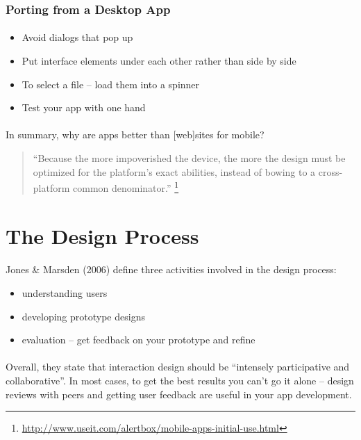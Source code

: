 \subsubsection{Porting from a Desktop App} 
\paragraph{} 

\begin{itemize}
\item Avoid dialogs that pop up
\item Put interface elements under each other rather than side by side
\item To select a file – load them into a spinner
\item Test your app with one hand
\end{itemize}


\paragraph{} In summary, why are apps better than [web]sites for mobile? 
\begin{quote}
``Because the more impoverished the device, the more the design must be optimized for the platform's exact abilities, instead of bowing to a cross-platform common denominator.'' \footnote{\url{http://www.useit.com/alertbox/mobile-apps-initial-use.html}}
\end{quote}

\section{The Design Process}
\paragraph{} Jones \& Marsden (2006) define three activities involved in the design process:

\begin{itemize}
\item understanding users
\item developing prototype designs
\item evaluation – get feedback on your prototype and refine
\end{itemize}

\paragraph{} Overall, they state that interaction design should be “intensely participative and collaborative”. In most cases, to get the best results you can't go it alone – design reviews with peers and getting user feedback are useful in your app development.

